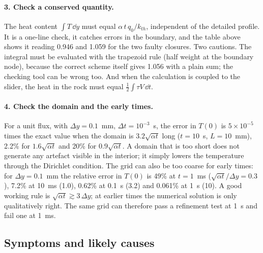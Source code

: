 \paragraph{3. Check a conserved quantity.} The heat content $\int T\,\dd y$ must equal $\alpha\,t\,q_0/k_{th}$, independent of the detailed profile. It is a one-line check, it catches errors in the boundary, and the table above shows it reading 0.946 and 1.059 for the two faulty closures. Two cautions. The integral must be evaluated with the trapezoid rule (half weight at the boundary node), because the correct scheme itself gives 1.056 with a plain sum; the checking tool can be wrong too. And when the calculation is coupled to the slider, the heat in the rock must equal $\tfrac12\int\tau V\,\dd t$.

\paragraph{4. Check the domain and the early times.} For a unit flux, with $\Delta y=0.1$~mm, $\Delta t=10^{-3}$~s, the error in $T(0)$ is $5\times10^{-5}$ times the exact value when the domain is $3.2\sqrt{\alpha t}$ long ($t=10$~s, $L=10$~mm), 2.2\% for $1.6\sqrt{\alpha t}$ and 20\% for $0.9\sqrt{\alpha t}$. A domain that is too short does not generate any artefact visible in the interior; it simply lowers the temperature through the Dirichlet condition. The grid can also be too coarse for early times: for $\Delta y=0.1$~mm the relative error in $T(0)$ is 49\% at $t=1$~ms ($\sqrt{\alpha t}/\Delta y=0.3$), 7.2\% at 10~ms (1.0), 0.62\% at 0.1~s (3.2) and 0.061\% at 1~s (10). A good working rule is $\sqrt{\alpha t}\gtrsim3\,\Delta y$; at earlier times the numerical solution is only qualitatively right. The same grid can therefore pass a refinement test at 1~s and fail one at 1~ms.

\subsection{Symptoms and likely causes}


